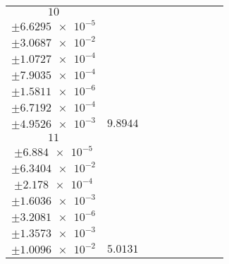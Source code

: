 \documentclass[8pt]{article}
\begin{document}
\begin{longtable}[l]{c c c c c c c c c}
$\num{10}$ & \begin{tabular}[c]{@{}c@{}}$\num{0.12426}$ \\ $\pm\num{6.6295e-5}$\end{tabular} & \begin{tabular}[c]{@{}c@{}}$\num{0.15857}$ \\ $\pm\num{3.0687e-2}$\end{tabular} & \begin{tabular}[c]{@{}c@{}}$\num{5.2049}$ \\ $\pm\num{1.0727e-4}$\end{tabular} & \begin{tabular}[c]{@{}c@{}}$\num{1.9347e+3}$ \\ $\pm\num{7.9035e-4}$\end{tabular} & \begin{tabular}[c]{@{}c@{}}$\num{3.8704}$ \\ $\pm\num{1.5811e-6}$\end{tabular} & \begin{tabular}[c]{@{}c@{}}$\num{1.1786}$ \\ $\pm\num{6.7192e-4}$\end{tabular} & \begin{tabular}[c]{@{}c@{}}$\num{4.2221}$ \\ $\pm\num{4.9526e-3}$\end{tabular} & $\num{9.8944}$\\
$\num{11}$ & \begin{tabular}[c]{@{}c@{}}$\num{6.2465e-2}$ \\ $\pm\num{6.884e-5}$\end{tabular} & \begin{tabular}[c]{@{}c@{}}$\num{0.25258}$ \\ $\pm\num{6.3404e-2}$\end{tabular} & \begin{tabular}[c]{@{}c@{}}$\num{-3.3754}$ \\ $\pm\num{2.178e-4}$\end{tabular} & \begin{tabular}[c]{@{}c@{}}$\num{1.9776e+3}$ \\ $\pm\num{1.6036e-3}$\end{tabular} & \begin{tabular}[c]{@{}c@{}}$\num{3.9562}$ \\ $\pm\num{3.2081e-6}$\end{tabular} & \begin{tabular}[c]{@{}c@{}}$\num{1.1691}$ \\ $\pm\num{1.3573e-3}$\end{tabular} & \begin{tabular}[c]{@{}c@{}}$\num{4.3143}$ \\ $\pm\num{1.0096e-2}$\end{tabular} & $\num{5.0131}$\\

\end{longtable}
\end{document}
